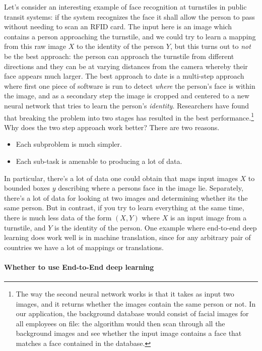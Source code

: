 \documentclass[12pt]{article}
\begin{document}
Let's consider an interesting example of face recognition at turnstiles in public transit systems: if the system recognizes the face
it shall allow the person to pass without needing to scan an RFID card. The input here is an image which contains a person approaching the turnstile, and we could try to learn a mapping from this raw image $X$ to the identity of the person $Y$, but this turns out to \emph{not} be the best approach: the person can approach the turnstile from different directions and they can be at varying distances from the camera whereby their face appears much larger. The best approach to date is a multi-step approach where first one piece of software is run to detect \emph{where} the person's face is within the image, and as a secondary step the image is cropped 
and centered to a new neural network that tries to learn the person's \emph{identity}. 
Researchers have found that breaking the problem into two stages has resulted in the best performance.\footnote{The way the second neural network works is that it takes as input two images, and it returns whether the images contain the same person or not. In our application, the background database would consist of facial images for all employees on file: the algorithm would then scan through
all the background images and see whether the input image contains a face that matches a face contained in the database.}
Why does the two step approach work better? There are two reasons.
\begin{itemize}   
  \item Each subproblem is much simpler.
  \item Each sub-task is amenable to producing a lot of data. 
\end{itemize}
In particular, there's a lot of data one could obtain that maps input images $X$ to bounded boxes $y$ describing where a persons face in the image lie. Separately, there's a lot of data for looking at two images and determining whether its the same person. But in contrast, if you try to learn everything at the same time, there is much less data of the form $(X,Y)$ where $X$ is an input image from a turnstile, and $Y$ is the identity of the person. One example where end-to-end deep learning does work well is in machine translation, since for any arbitrary pair of countries we have a lot of mappings or translations.

\paragraph{Whether to use End-to-End deep learning}
\end{document}
